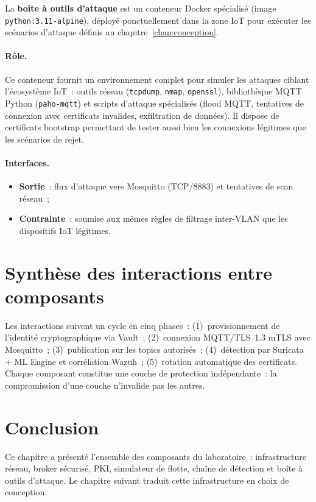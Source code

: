 La \textbf{boîte à outils d'attaque} est un conteneur Docker spécialisé (image \texttt{python:3.11-alpine}), déployé ponctuellement dans la zone IoT pour exécuter les scénarios d'attaque définis au chapitre~\ref{chap:conception}.

\paragraph{Rôle.}
Ce conteneur fournit un environnement complet pour simuler les attaques ciblant l'écosystème IoT~: outils réseau (\texttt{tcpdump}, \texttt{nmap}, \texttt{openssl}), bibliothèque MQTT Python (\texttt{paho-mqtt}) et scripts d'attaque spécialisés (flood MQTT, tentatives de connexion avec certificats invalides, exfiltration de données). Il dispose de certificats bootstrap permettant de tester aussi bien les connexions légitimes que les scénarios de rejet.

\paragraph{Interfaces.}
\begin{itemize}[leftmargin=*]
  \item \textbf{Sortie}~: flux d'attaque vers Mosquitto (TCP/8883) et tentatives de scan réseau~;
  \item \textbf{Contrainte}~: soumise aux mêmes règles de filtrage inter-VLAN que les dispositifs IoT légitimes.
\end{itemize}

\section{Synthèse des interactions entre composants}
\label{sec:env-synthese}

Les interactions suivent un cycle en cinq phases~: (1)~provisionnement de l'identité cryptographique via Vault~; (2)~connexion MQTT/TLS~1.3 mTLS avec Mosquitto~; (3)~publication sur les topics autorisés~; (4)~détection par Suricata + ML Engine et corrélation Wazuh~; (5)~rotation automatique des certificats. Chaque composant constitue une couche de protection indépendante~: la compromission d'une couche n'invalide pas les autres.

\section{Conclusion}
\label{sec:env-conclusion}

Ce chapitre a présenté l'ensemble des composants du laboratoire~: infrastructure réseau, broker sécurisé, PKI, simulateur de flotte, chaîne de détection et boîte à outils d'attaque. Le chapitre suivant traduit cette infrastructure en choix de conception.
